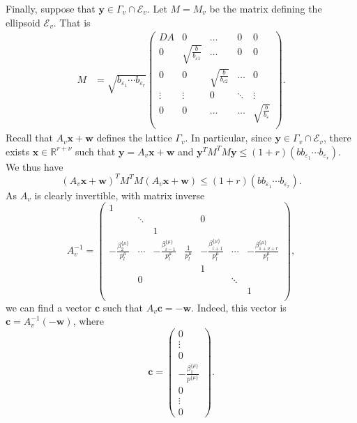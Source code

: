 Finally, suppose that $\mathbf{y}\in \Gamma_v\cap \mathcal E_v$. Let $M=M_v$ be the matrix defining the ellipsoid $\mathcal{E}_v$. That is
\begin{align*}
M &=\sqrt{b_{\varepsilon_1}\cdots b_{\varepsilon_r}}\begin{pmatrix}
	DA & 0 & \dots & 0 & 0\\
	0 & \sqrt{\frac{b}{b_{\varepsilon 1}}} & \dots & 0 & 0\\
	0 & 0  & \sqrt{\frac{b}{b_{\varepsilon 2}}} & \dots & 0\\
	\vdots & \vdots &0 &  \ddots & \vdots\\ 
	0 & 0 & \dots & \dots & \sqrt{\frac{b}{b_{\varepsilon}}} \\
	\end{pmatrix}.
\end{align*}	
Recall that $A_{v}\mathbf{x} + \mathbf{w}$ defines the lattice $\Gamma_v$. In particular, since $\mathbf{y}\in \Gamma_v\cap \mathcal E_v$, there exists $\mathbf{x}\in \mathbb{R}^{r + \nu}$ such that $\mathbf{y}=A_v \mathbf{x}+\mathbf{w}$ and ${\mathbf{y}^TM^TM\mathbf{y}\leq (1 + r)(bb_{\varepsilon_1}\cdots b_{\varepsilon_r})}$. We thus have
\[(A_v \mathbf{x}+\mathbf{w})^TM^TM(A_v \mathbf{x}+\mathbf{w}) \leq (1 + r)(bb_{\varepsilon_1}\cdots b_{\varepsilon_r}).\]
As $A_{v}$ is clearly invertible, with matrix inverse
\[A_{v}^{-1} = \begin{pmatrix}
1	& 		&		&		&		&		&	\\
	& \ddots	& 		&		& 0		& 		&	\\
	&		& 1		&		&		&		&	\\
	-\frac{\beta_2^{\{\mu\}}}{p_l^{\mu}} & \cdots & -\frac{\beta_{\hat{i} - 1}^{\{\mu\}}}{p_l^{\mu}} & \frac{1}{p_l^{\mu}} & -\frac{\beta_{\hat{i} + 1}^{\{\mu\}}}{p_l^{\mu}}& \cdots &-\frac{\beta_{1+ \nu+ r}^{\{\mu\}}}{p_l^{\mu}}\\
	& 		& 		& 		& 1		&		&	\\	
	& 0		& 		& 		&		& \ddots	&	\\	
	& 		& 		& 		&		& 		& 1	\\
	\end{pmatrix},\]
we can find a vector $\mathbf{c}$ such that $A_{v}\mathbf{c} = -\mathbf{w}$. Indeed, this vector is $\mathbf{c} = A_{v}^{-1}(-\mathbf{w})$, where
\[\mathbf{c}=\begin{pmatrix}
	0 \\ \vdots \\ 0 \\-\frac{\beta_1^{\{\mu\}}}{p^{\{\mu\}}} \\ 0 \\ \vdots \\ 0
\end{pmatrix}.\]
